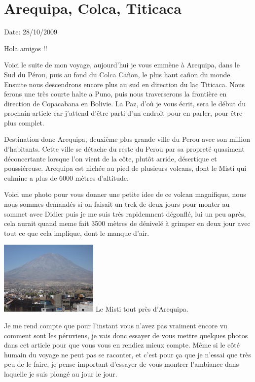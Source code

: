 \section{Arequipa, Colca, Titicaca}

Date: 28/10/2009

\begin{multicols}{2}

Hola amigos !!

Voici le suite de mon voyage, aujourd'hui je vous emmène à Arequipa, dans le Sud du Pérou, puis au fond du Colca Cañon, le plus haut cañon du monde. Ensuite nous descendrons encore plus au sud en direction du lac Titicaca. Nous ferons une très courte halte a Puno, puis nous traverserons la frontière en direction de Copacabana en Bolivie. La Paz, d'où je vous écrit, sera le début du prochain article car j'attend d'être parti d'un endroit pour en parler, pour être plus complet.

Destination donc Arequipa, deuxième plus grande ville du Perou avec son million d'habitants. Cette ville se détache du reste du Perou par sa propreté quasiment déconcertante lorsque l'on vient de la côte, plutôt arride, désertique et poussiéreuse. Arequipa est nichée au pied de plusieurs volcans, dont le Misti qui culmine a plus de 6000 mètres d'altitude.

Voici une photo pour vous donner une petite idee de ce volcan magnifique, nous nous sommes demandés si on faisait un trek de deux jours pour monter au sommet avec Didier puis je me suis très rapidemnent dégonflé, lui un peu après, cela aurait quand meme fait 3500 mètres de dénivelé à grimper en deux jour avec tout ce que cela implique, dont le manque d'air.

\hspace*{-0.65cm}
\includegraphics[width=4.8cm]{articles/Arequipa-colca-titicaca/1256606928TSDk.jpg}
Le Misti tout près d'Arequipa.

Je me rend compte que pour l'instant vous n'avez pas vraiment encore vu comment sont les péruviens, je vais donc essayer de vous mettre quelques photos dans cet article pour que vous vous en rendiez mieux compte. Même si le côté humain du voyage ne peut pas se raconter, et c'est pour ça que je n'essai que très peu de le faire, je pense important d'essayer de vous montrer l'ambiance dans laquelle je suis plongé au jour le jour.


\end{multicols}
